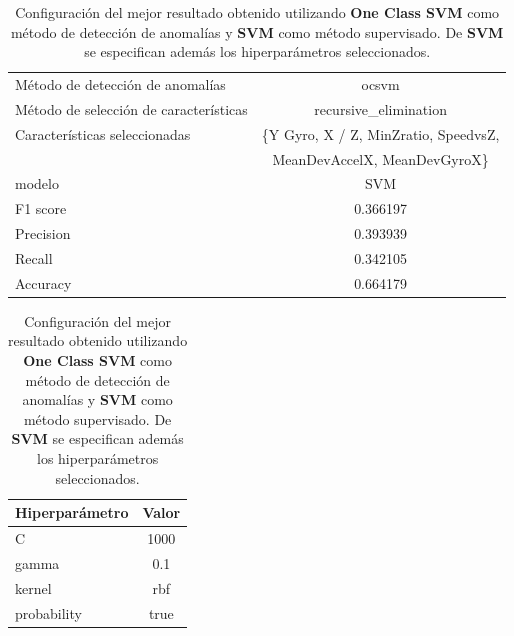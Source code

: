 \begin{appendices}
		\begin{table}[htb]
			\centering
			\caption{Configuración del mejor resultado obtenido utilizando \textbf{One Class SVM} como método de detección de anomalías y \textbf{SVM}
			como método supervisado. De \textbf{SVM} se especifican además los hiperparámetros seleccionados.}
			\label{table:28}
			\begin{tabular}{lc}
				\toprule
					  Método de detección de anomalías &                                              ocsvm \\
				Método de selección de características &                              recursive\_elimination \\
						 Características seleccionadas & \{Y Gyro, X / Z, MinZratio, SpeedvsZ,   \\ 
						 							   &   MeanDevAccelX, MeanDevGyroX\}\\
												modelo &                                                SVM \\
											  F1 score &                                           0.366197 \\
											 Precision &                                           0.393939 \\
												Recall &                                           0.342105 \\
											  Accuracy &                                           0.664179 \\
				\bottomrule
			\end{tabular}
			\newline
			\newline

			\begin{tabular}{lc}
				\toprule
				Hiperparámetro & Valor \\
				\midrule
							 C &  1000 \\
						 gamma &   0.1 \\
						kernel &   rbf \\
				   probability &  true \\
				\bottomrule
			\end{tabular}
			
		\end{table}


\end{appendices}
